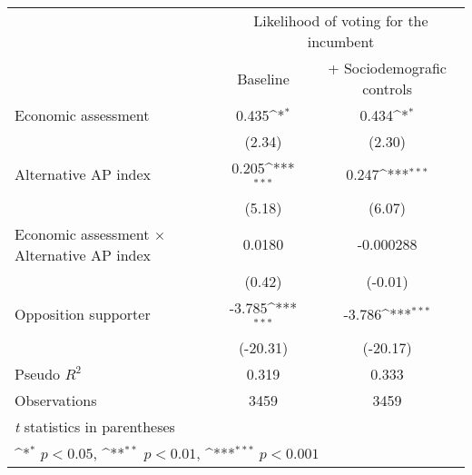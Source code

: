 {
\def\sym#1{\ifmmode^{#1}\else\(^{#1}\)\fi}
\begin{tabular}{l*{2}{c}}
\toprule
                &\multicolumn{2}{c}{Likelihood of voting for the incumbent}\\\cmidrule(lr){2-3}
                & Baseline         &+ Sociodemografic controls         \\
\midrule
Economic assessment&    0.435\sym{*}  &    0.434\sym{*}  \\
                &   (2.34)         &   (2.30)         \\
Alternative AP index&    0.205\sym{***}&    0.247\sym{***}\\
                &   (5.18)         &   (6.07)         \\
Economic assessment $\times$ Alternative AP index&   0.0180         &-0.000288         \\
                &   (0.42)         &  (-0.01)         \\
Opposition supporter&   -3.785\sym{***}&   -3.786\sym{***}\\
                & (-20.31)         & (-20.17)         \\
\midrule
Pseudo \(R^{2}\)&    0.319         &    0.333         \\
Observations    &     3459         &     3459         \\
\bottomrule
\multicolumn{3}{l}{\footnotesize \textit{t} statistics in parentheses}\\
\multicolumn{3}{l}{\footnotesize \sym{*} \(p<0.05\), \sym{**} \(p<0.01\), \sym{***} \(p<0.001\)}\\
\end{tabular}
}
